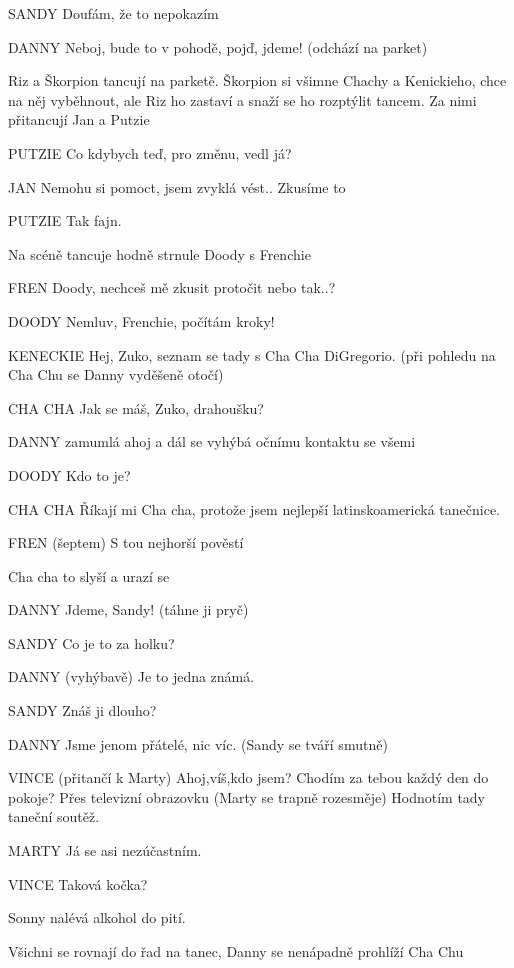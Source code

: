 SANDY        Doufám, že to nepokazím 

DANNY        Neboj, bude to v pohodě, pojď, jdeme! (odchází na parket)

        Riz a Škorpion tancují na parketě. Škorpion si všimne Chachy a Kenickieho, chce na něj vyběhnout, ale Riz ho zastaví a snaží se ho rozptýlit tancem. Za nimi přitancují Jan a Putzie

PUTZIE        Co kdybych teď, pro změnu, vedl já?

JAN        Nemohu si pomoct, jsem zvyklá vést.. Zkusíme to

PUTZIE        Tak fajn. 

Na scéně tancuje hodně strnule Doody s Frenchie

FREN        Doody, nechceš mě zkusit protočit nebo tak..?

DOODY        Nemluv, Frenchie, počítám kroky! 

KENECKIE        Hej, Zuko, seznam se tady s Cha Cha DiGregorio. (při pohledu na Cha         Chu se Danny vyděšeně otočí)

CHA CHA         Jak se máš, Zuko, drahoušku?

DANNY        zamumlá ahoj a dál se vyhýbá očnímu kontaktu se všemi 

DOODY        Kdo to je? 

CHA CHA        Říkají mi Cha cha, protože jsem nejlepší latinskoamerická tanečnice. 

FREN        (šeptem) S tou nejhorší pověstí

Cha cha to slyší a urazí se 

DANNY        Jdeme, Sandy! (táhne ji pryč)

SANDY         Co je to za holku? 

DANNY        (vyhýbavě) Je to jedna známá.  

SANDY        Znáš ji dlouho? 

DANNY        Jsme jenom přátelé, nic víc. (Sandy se tváří smutně) 

VINCE        (přitančí k Marty) Ahoj,víš,kdo jsem? Chodím za tebou každý den do pokoje? Přes televizní obrazovku (Marty se trapně rozesměje) Hodnotím tady taneční soutěž. 

MARTY        Já se asi nezúčastním.

VINCE        Taková kočka? 

Sonny nalévá alkohol do pití.

Všichni se rovnají do řad na tanec, Danny se nenápadně prohlíží Cha Chu 

